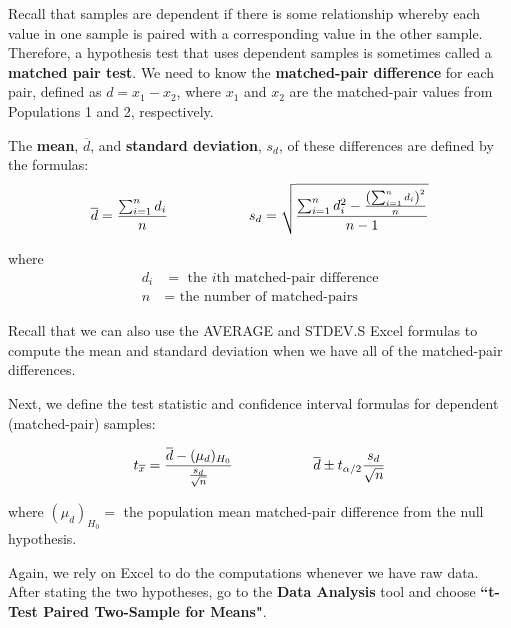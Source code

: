 \documentclass[12pt, letterpaper]{article}
\theoremstyle{definition}
\begin{document}
\begin{statement}
\noindent Recall that samples are dependent if there is some relationship whereby each value in one sample is paired with a corresponding value in the other sample.  Therefore, a hypothesis test that uses dependent samples is sometimes called a \textbf{matched pair test}.  We need to know the \textbf{matched-pair difference} for each pair, defined as $d=x_1-x_2$, where $x_1$ and $x_2$ are the matched-pair values from Populations 1 and 2, respectively.

\vspace*{.1in}

\noindent The \textbf{mean}, $\overline{d}$, and \textbf{standard deviation}, $s_d$, of these differences are defined by the formulas:
$$ \overline{d}=\frac{\sum_{i=1}^n d_i}{ n }\hspace*{.8in}  s_d = \sqrt{\frac{\sum_{i=1}^n d_i^2 - \frac{\left( \sum_{i=1}^n d_i \right)^2}{n}}{n-1}} $$

where
\begin{align*}
d_i &= \text{ the $i$th matched-pair difference}\\
n &= \text{ the number of matched-pairs}
\end{align*}

\end{statement}

\begin{statement}
Recall that we can also use the AVERAGE and STDEV.S Excel formulas to compute the mean and standard deviation when we have all of the matched-pair differences.

\vspace*{.1in}

Next, we define the test statistic and confidence interval formulas for dependent (matched-pair) samples:

$$ t_{\overline{x}} = \frac{\overline{d}-(\mu_d)_{H_0}}{\frac{s_d}{\sqrt{n}}}\hspace*{.8in} \overline{d}\pm t_{\alpha/2}\frac{s_d}{\sqrt{n}} $$

where $(\mu_d)_{H_0}=$ the population mean matched-pair difference from the null hypothesis. 

\end{statement}

\noindent Again, we rely on Excel to do the computations whenever we have raw data.  After stating the two hypotheses, go to the \textbf{Data Analysis} tool and choose \textbf{``t-Test Paired Two-Sample for Means"}.
\end{document}
